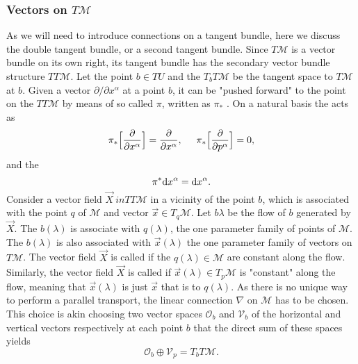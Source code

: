 \subsubsection{Vectors on $T\mathcal{M}$}

As we will need to introduce connections on a tangent bundle, here we discuss the 
double tangent bundle, or a second tangent bundle. Since $T\mathcal{M}$ is a vector bundle on its own right, 
its tangent bundle has the secondary vector bundle structure $TT\mathcal{M}$. 
Let the point $b\in TU$ and the $T_b T\mathcal{M}$ be the tangent space to $T\mathcal{M}$ at $b$. 
%
Given a vector $\partial/\partial x^{\alpha}$ at a point $b$, it can be "pushed forward" to the point on 
the $TT\mathcal{M}$ by means of so called  $\pi$, written as $\pi_*$ \citep{Frankel:2002}.
%
On a natural basis the  acts as 
%
\begin{equation}
\pi_*\Big[\frac{\partial}{\partial x^{\alpha}}\Big] = \frac{\partial}{\partial x^{\alpha}}, \hspace{5mm} \pi_* \Big[\frac{\partial}{\partial p^{\alpha}}\Big] = 0,
\end{equation}
%
and the   
%
\begin{equation}
\pi^* {\text d} x^{\alpha} = {\text d} x^{\alpha}.
\end{equation}
%
Consider a vector field $\vec{X} \ in TT\mathcal{M}$ in a vicinity of the point $b$, which is 
associated with the point $q$ of $\mathcal{M}$ and vector $\vec{x}\in T_{q}\mathcal{M}$. 
Let $b{\lambda}$ be the flow of $b$ generated by $\vec{X}$. 
The $b(\lambda)$ is associate with $q(\lambda)$, the one parameter family of points of $\mathcal{M}$. 
The $b(\lambda)$ is also associated with $\vec{x}(\lambda)$ the one parameter family of vectors on $T\mathcal{M}$. 
%
The vector field $\vec{X}$ is called  if the $q(\lambda)\in\mathcal{M}$ are constant along the flow. 
Similarly, the vector field $\vec{X}$ is called  if $\vec{x}(\lambda)\in T_p \mathcal{M}$ 
is "constant" along the flow, meaning that $\vec{x}(\lambda)$ is just $\vec{x}$ that is 
 to $q(\lambda)$. 
%
As there is no unique way to perform a parallel transport, the linear connection $\nabla$ on $\mathcal{M}$ 
has to be chosen. This choice is akin choosing two vector spaces $\mathcal{O}_b$ and $\mathcal{V}_b$ 
of the horizontal and vertical vectors respectively at each point $b$ that the direct sum of these spaces yields
%
\begin{equation}
\mathcal{O}_b\oplus \mathcal{V}_p = T_b T\mathcal{M}.
\end{equation}
